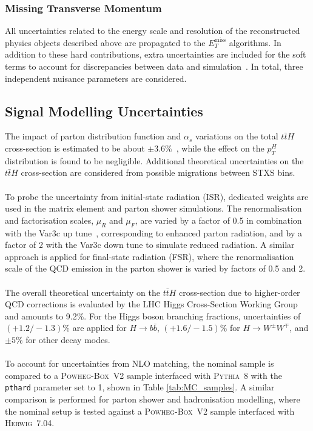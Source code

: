 \subsubsection{Missing Transverse Momentum}
All uncertainties related to the energy scale and resolution of the reconstructed physics objects described above are propagated to the $E_{T}^{\text{miss}}$ algorithms.  In addition to these hard contributions, extra uncertainties are included for the soft terms to account for discrepancies between data and simulation~\cite{missing_transverse}.  In total, three independent nuisance parameters are considered.  
\subsection{Signal Modelling Uncertainties}
The impact of parton distribution function and $\alpha_{s}$ variations on the total $t\bar{t}H$ cross-section is estimated to be about $\pm 3.6\%$~\cite{Lonnblad2005PartonShowers}, while the effect on the $p_{T}^{H}$ distribution is found to be negligible. Additional theoretical uncertainties on the $t\bar{t}H$ cross-section are considered from possible migrations between STXS bins.\\
\\
To probe the uncertainty from initial-state radiation (ISR), dedicated weights are used in the matrix element and parton shower simulations. The renormalisation and factorisation scales, $\mu_{R}$ and $\mu_{F}$, are varied by a factor of 0.5 in combination with the Var3c up tune~\cite{PYTHIA8}, corresponding to enhanced parton radiation, and by a factor of 2 with the Var3c down tune to simulate reduced radiation. A similar approach is applied for final-state radiation (FSR), where the renormalisation scale of the QCD emission in the parton shower is varied by factors of 0.5 and 2.\\
\\
The overall theoretical uncertainty on the $t\bar{t}H$ cross-section due to higher-order QCD corrections is evaluated by the LHC Higgs Cross-Section Working Group and amounts to 9.2\%. For the Higgs boson branching fractions, uncertainties of $(+1.2/-1.3)\%$ are applied for $H \to b\bar{b}$, $(+1.6/-1.5)\%$ for $H \to W^{\pm}W^{\mp}$, and $\pm 5\%$ for other decay modes.  \\
\\
To account for uncertainties from NLO matching, the nominal sample is compared to a \textsc{Powheg-Box}~V2 sample interfaced with \textsc{Pythia}~8 with the \texttt{pthard} parameter set to 1, shown in Table \ref{tab:MC_samples}. A similar comparison is performed for parton shower and hadronisation modelling, where the nominal setup is tested against a \textsc{Powheg-Box}~V2 sample interfaced with \textsc{Herwig}~7.04.  

